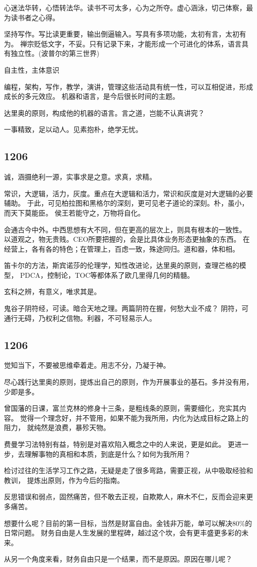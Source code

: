 心迷法华转，心悟转法华。读书不可太多，心为之所夺。虚心涵泳，切己体察，最为读书者之心得。

坚持写作。写比读更重要，输出倒逼输入。写具有多项功能，太初有言，太初有为。
禅宗贬低文字，不妥。只有记录下来，才能形成一个可进化的体系，语言具有独立性。(波普尔的第三世界)

自主性，主体意识

编程，架构，写作，教学，演讲，管理这些活动具有统一性，可以互相促进，形成成长的多元效应。
机器和语言，是今后很长时间的主题。

达里奥的原则，构成他的机器的语言。言之道，岂能不认真讲究？

一事精致，足以动人。见素抱朴，绝学无忧。

\subsection{1206}

诚，涵摄绝利一源，实事求是之意。求真，求精。

常识，大逻辑，活力，灰度。重点在大逻辑和活力，常识和灰度是对大逻辑的必要辅助。
于此，可见柏拉图和黑格尔的深刻，更可见老子道论的深刻。朴，虽小，而天下莫能臣。
侯王若能守之，万物将自化。

会通古今中外。中西思想有大不同，但在更高的层次上，则具有根本的一致性。
以道观之，物无贵贱。CEO所要把握的，会是比具体业务形态更抽象的东西。
在经营上，各有各的特色；在管理上，百虑一致，殊途同归。道和器，体和相。

笛卡尔的方法，斯宾诺莎的伦理学，知性改进论，达里奥的原则，查理芒格的模型，
PDCA，控制论，TOC等都体系了欧几里得几何的精髓。

玄科之辨，有意义，唯求其是。

鬼谷子阴符经，可读。暗合天地之理。两篇阴符在握，何愁大业不成？
阴符，可通行无碍，乃权利之信物。利器，不可轻易示人。

\subsection{1206}

觉知当下，不要被思维牵着走。用志不分，乃凝于神。

尽心践行达里奥的原则，提炼出自己的原则，作为开展事业的基石。多并没有用，少即是多。

曾国藩的日课，富兰克林的修身十三条，是粗线条的原则，需要细化，充实其内容。
觉得一个理念好，并不管用，如果不能为我所用，内化为达成目标之路上的阻力，
就纯然是浪费，暴殄天物。

费曼学习法特别有益，特别是对喜欢陷入概念之中的人来说，更是如此。
更进一步，去理解事物的真相和本质，到底是什么？如何为我所用？

检讨过往的生活学习工作之路，无疑是走了很多弯路，需要正视，从中吸取经验和教训，
提炼出原则，作为今后的指南。

反思错误和弱点，固然痛苦，但不敢去正视，自欺欺人，麻木不仁，反而会迎来更多痛苦。

想要什么呢？目前的第一目标，当然是财富自由。金钱非万能，单可以解决80\%的日常问题。
财务自由是人生发展的里程碑，越过这个坎，会有更丰盛更多彩的未来。

从另一个角度来看，财务自由只是一个结果，而不是原因。原因在哪儿呢？
